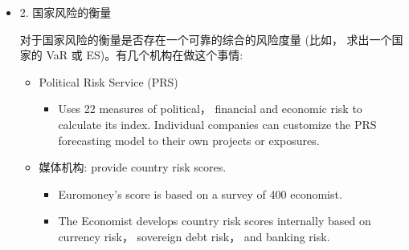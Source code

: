 \begin{itemize}
\begin{itemize}
\begin{itemize}
    \item Legal risk is the risk of losses due to inadequacies or biases in a country' s legal system. Property rights and contract enforcement are important aspects of a legal system.

    \item 核心思想:法律体系是否健全有效 - 
\end{itemize}

 \item Economic Structure
 \begin{itemize}

    \item It is also important to assess the country's competitive advantages and the extent to which its economy is diversified.

    \item 过度依赖单一商品/服务的经济体风险较高，比如过度依赖石油、或旅游业等。

    \item 经济多样化在小型经济体中很难实现。
\end{itemize}
\end{itemize}

 \item 2. 国家风险的衡量

对于国家风险的衡量是否存在一个可靠的综合的风险度量 (比如， 求出一个国家的 VaR 或 ES)。有几个机构在做这个事情:

\begin{itemize}
\item Political Risk Service (PRS)

\begin{itemize}
\item Uses 22 measures of political， financial and economic risk to calculate its index. Individual companies can customize the PRS forecasting model to their own projects or exposures.
\end{itemize}

\item 媒体机构: provide country risk scores.
\begin{itemize}


\item Euromoney's score is based on a survey of 400 economist.


\item The Economist develops country risk scores internally based on currency risk， sovereign debt risk， and banking risk.
\end{itemize}


\end{itemize}
\end{itemize}
